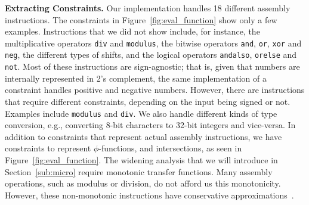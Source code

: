 \documentclass{llncs}
\begin{document}
\noindent
\textbf{Extracting Constraints.}
Our implementation handles 18 different assembly instructions.
The constraints in Figure~\ref{fig:eval_function} show only a few examples.
Instructions that we did not show include, for instance, the multiplicative
operators \texttt{div} and \texttt{modulus},
the bitwise operators \texttt{and}, \texttt{or}, \texttt{xor} and \texttt{neg},
the different types of shifts, and the
logical operators \texttt{andalso}, \texttt{orelse} and \texttt{not}.
Most of these instructions are sign-agnostic; that is, given that numbers are
internally represented in 2's complement, the same implementation of a
constraint handles positive and negative numbers.
However, there are instructions that require different constraints, depending on
the input being signed or not.
Examples include \texttt{modulus} and \texttt{div}.
We also handle different kinds of type conversion, e.g., converting 8-bit
characters to 32-bit integers and vice-versa.
In addition to constraints that represent actual assembly instructions, we have
constraints to represent $\phi$-functions, and intersections, as seen in
Figure~\ref{fig:eval_function}.
The widening analysis that we will introduce in Section~\ref{sub:micro}
require monotonic transfer functions.
Many assembly operations, such as modulus or division, do not afford us
this monotonicity.
However, these non-monotonic instructions have conservative
approximations~\cite{Warren02}.

%
\end{document}
